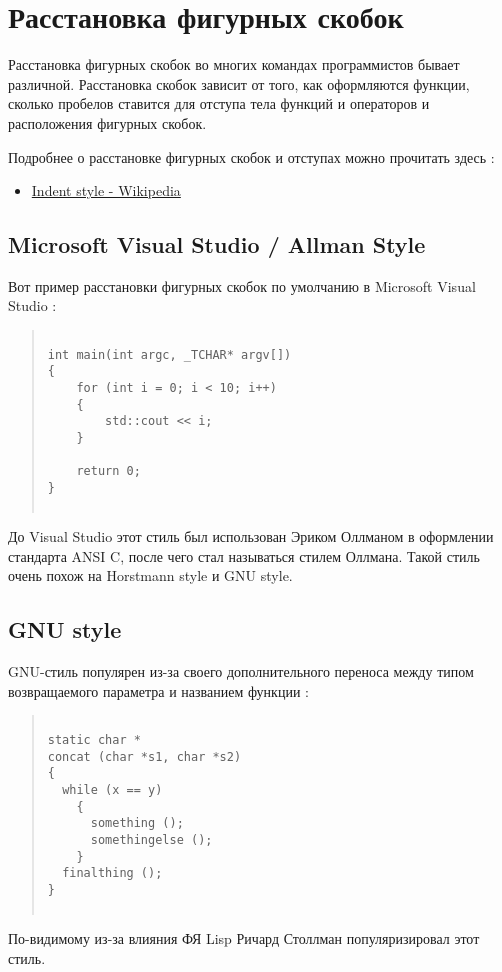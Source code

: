 \section{  Расстановка фигурных скобок }

Расстановка фигурных скобок во многих командах программистов бывает различной. Расстановка скобок зависит от того, как оформляются функции, сколько пробелов ставится для отступа тела функций и операторов и расположения фигурных скобок.

Подробнее о расстановке фигурных скобок и отступах можно прочитать здесь :
\begin{itemize}
\item \href{ http://en.wikipedia.org/wiki/Indent_style#Allman_style_.28bsd_in_Emacs.29}{ Indent style - Wikipedia}
\end{itemize}

\subsection{  Microsoft Visual Studio / Allman Style }

Вот пример расстановки фигурных скобок по умолчанию в Microsoft Visual Studio :
\begin{quote}
\begin{verbatim}
 
int main(int argc, _TCHAR* argv[])
{
    for (int i = 0; i < 10; i++) 
    {
        std::cout << i;
    }
    
    return 0;
}
 
\end{verbatim}
\end{quote}
До Visual Studio этот стиль был использован Эриком Оллманом в оформлении стандарта ANSI C, после чего стал называться стилем Оллмана.
Такой стиль очень похож на Horstmann style и GNU style.

\subsection{  GNU style }

GNU-стиль популярен из-за своего дополнительного переноса между типом возвращаемого параметра и названием функции :
\begin{quote}
\begin{verbatim}
 
static char *
concat (char *s1, char *s2)
{
  while (x == y)
    {
      something ();
      somethingelse ();
    }
  finalthing ();
}
 
\end{verbatim}
\end{quote}
По-видимому из-за влияния ФЯ Lisp Ричард Столлман популяризировал этот стиль.


